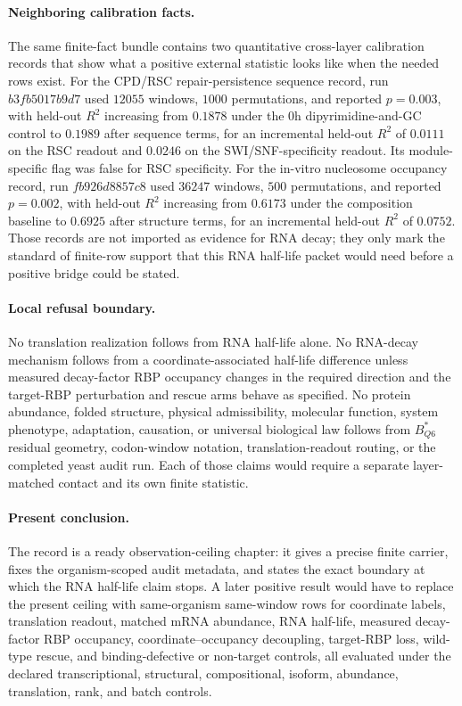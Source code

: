 \paragraph{Neighboring calibration facts.}
The same finite-fact bundle contains two quantitative cross-layer calibration records that show what a positive external statistic looks like when the needed rows exist.  For the CPD/RSC repair-persistence sequence record, run $b3fb5017b9d7$ used $12055$ windows, $1000$ permutations, and reported $p = 0.003$, with held-out $R^2$ increasing from $0.1878$ under the $0$h dipyrimidine-and-GC control to $0.1989$ after sequence terms, for an incremental held-out $R^2$ of $0.0111$ on the RSC readout and $0.0246$ on the SWI/SNF-specificity readout.  Its module-specific flag was false for RSC specificity.  For the in-vitro nucleosome occupancy record, run $fb926d8857c8$ used $36247$ windows, $500$ permutations, and reported $p = 0.002$, with held-out $R^2$ increasing from $0.6173$ under the composition baseline to $0.6925$ after structure terms, for an incremental held-out $R^2$ of $0.0752$.  Those records are not imported as evidence for RNA decay; they only mark the standard of finite-row support that this RNA half-life packet would need before a positive bridge could be stated.

\paragraph{Local refusal boundary.}
No translation realization follows from RNA half-life alone.  No RNA-decay mechanism follows from a coordinate-associated half-life difference unless measured decay-factor RBP occupancy changes in the required direction and the target-RBP perturbation and rescue arms behave as specified.  No protein abundance, folded structure, physical admissibility, molecular function, system phenotype, adaptation, causation, or universal biological law follows from $B^*_{Q6}$ residual geometry, codon-window notation, translation-readout routing, or the completed yeast audit run.  Each of those claims would require a separate layer-matched contact and its own finite statistic.

\paragraph{Present conclusion.}
The record is a ready observation-ceiling chapter: it gives a precise finite carrier, fixes the organism-scoped audit metadata, and states the exact boundary at which the RNA half-life claim stops.  A later positive result would have to replace the present ceiling with same-organism same-window rows for coordinate labels, translation readout, matched mRNA abundance, RNA half-life, measured decay-factor RBP occupancy, coordinate--occupancy decoupling, target-RBP loss, wild-type rescue, and binding-defective or non-target controls, all evaluated under the declared transcriptional, structural, compositional, isoform, abundance, translation, rank, and batch controls.